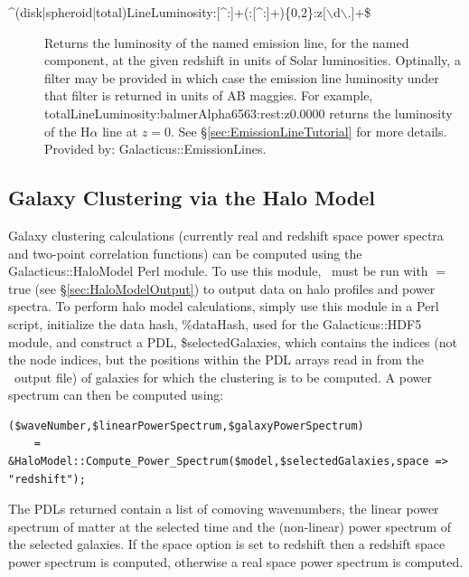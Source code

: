 \begin{description}
 \item[{\normalfont \ttfamily \textasciicircum (disk|spheroid|total)LineLuminosity:[\textasciicircum:]+(:[\textasciicircum:]+)\{0,2\}:z[$\backslash$d$\backslash$.]+\$}] Returns the luminosity of the named emission line, for the named component, at the given redshift in units of Solar luminosities. Optinally, a filter may be provided in which case the emission line luminosity under that filter is returned in units of AB \glspl{maggie}. For example, {\normalfont \ttfamily totalLineLuminosity:balmerAlpha6563:rest:z0.0000} returns the luminosity of the H$\alpha$ line at $z=0$. See \S\ref{sec:EmissionLineTutorial} for more details. Provided by: {\normalfont \ttfamily Galacticus::EmissionLines}. 
\end{description}

\subsection{Galaxy Clustering via the Halo Model}\label{sec:ClusteringHaloModel}

Galaxy clustering calculations (currently real and redshift space power spectra and two-point correlation functions) can be computed using the {\normalfont \ttfamily Galacticus::HaloModel} Perl module. To use this module, \glc\ must be run with {\normalfont \ttfamily [outputHaloModelData]}$=${\normalfont \ttfamily true} (see \S\ref{sec:HaloModelOutput}) to output data on halo profiles and power spectra. To perform halo model calculations, simply use this module in a Perl script, initialize the data hash, {\normalfont \ttfamily \%dataHash}, used for the {\normalfont \ttfamily Galacticus::HDF5} module, and construct a PDL, {\normalfont \ttfamily \$selectedGalaxies}, which contains the indices (not the node indices, but the positions within the PDL arrays read in from the \glc\ output file) of galaxies for which the clustering is to be computed. A power spectrum can then be computed using:
\begin{verbatim}
($waveNumber,$linearPowerSpectrum,$galaxyPowerSpectrum) 
    = &HaloModel::Compute_Power_Spectrum($model,$selectedGalaxies,space => "redshift");
\end{verbatim}
The PDLs returned contain a list of comoving wavenumbers, the linear power spectrum of matter at the selected time and the (non-linear) power spectrum of the selected galaxies. If the {\normalfont \ttfamily space} option is set to {\normalfont \ttfamily redshift} then a redshift space power spectrum is computed, otherwise a real space power spectrum is computed.

